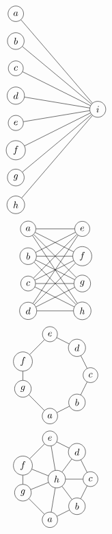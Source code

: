 \documentclass[12pt, A4]{article}
\begin{document}
\begin{enumerate}
\begin{tasks}
\[\begin{tikzpicture}
								\node[circle, draw] (a1) at (0, 0) {\(a\)};
								\node[circle, draw] (a2) at (0, -1) {\(b\)}; 
								\node[circle, draw] (a3) at (0, -2) {\(c\)};
								\node[circle, draw] (a4) at (0, -3) {\(d\)};
								\node[circle, draw] (a5) at (0, -4) {\(e\)};
								\node[circle, draw] (a6) at (0, -5) {\(f\)};
								\node[circle, draw] (a7) at (0, -6) {\(g\)};
								\node[circle, draw] (a8) at (0, -7) {\(h\)};
								\node[circle, draw] (a9) at (3, -3.5) {\(i\)};
								\foreach \x in {1,...,8}
									\draw (a\x) -- (a9);
							\end{tikzpicture}\]
						\task
							\[\begin{tikzpicture}
								\node[circle, draw] (a1) at (0, 0) {\(a\)};
								\node[circle, draw] (a2) at (0, -1) {\(b\)};
								\node[circle, draw] (a3) at (0, -2) {\(c\)};
								\node[circle, draw] (a4) at (0, -3) {\(d\)};
								\node[circle, draw] (a5) at (2, 0) {\(e\)};
								\node[circle, draw] (a6) at (2, -1) {\(f\)};
								\node[circle, draw] (a7) at (2, -2) {\(g\)};
								\node[circle, draw] (a8) at (2, -3) {\(h\)};
								\foreach \x in {1,...,4}
									\foreach \y in {5,...,8}
										\draw (a\x) -- (a\y);
							\end{tikzpicture}\]
						\task
							\[\begin{tikzpicture}
								\node[circle, draw] (a1) at (0, 0) {\(a\)};
								\node[circle, draw] (a2) at (1, 0.5) {\(b\)};
								\node[circle, draw] (a3) at (1.5, 1.5) {\(c\)};
								\node[circle, draw] (a4) at (1, 2.5) {\(d\)};
								\node[circle, draw] (a5) at (0, 3) {\(e\)};
								\node[circle, draw] (a6) at (-1, 2) {\(f\)};
								\node[circle, draw] (a7) at (-1, 1){\(g\)};
								\draw (a1) -- (a2);
								\draw (a2) -- (a3);
								\draw (a3) -- (a4);
								\draw (a4) -- (a5);
								\draw (a5) -- (a6);
								\draw (a6) -- (a7);
								\draw (a7) -- (a1);
							\end{tikzpicture}\]
						\task
							\[\begin{tikzpicture}
								\node[circle, draw] (a1) at (0, 0) {\(a\)};
								\node[circle, draw] (a2) at (1, 0.5) {\(b\)};
								\node[circle, draw] (a3) at (1.5, 1.5) {\(c\)};
								\node[circle, draw] (a4) at (1, 2.5) {\(d\)};
								\node[circle, draw] (a5) at (0, 3) {\(e\)};
								\node[circle, draw] (a6) at (-1, 2) {\(f\)};
								\node[circle, draw] (a7) at (-1, 1){\(g\)};
								\node[circle, draw] (a8) at (0.25, 1.5) {\(h\)};
								\draw (a1) -- (a2);
								\draw (a2) -- (a3);
								\draw (a3) -- (a4);
								\draw (a4) -- (a5);
								\draw (a5) -- (a6);
								\draw (a6) -- (a7);
								\draw (a7) -- (a1);
								\foreach \x in {1,...,7}
									\draw (a\x) -- (a8);
							\end{tikzpicture}\]
						\task
							

\end{tasks}
\end{enumerate}
\end{document}
